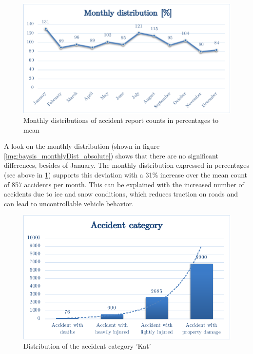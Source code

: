 \documentclass[a4paper,12pt]{report}
\begin{document}
\begin{figure}[h]
	\centering
	\includegraphics[scale=0.6]{./assets/baysis_dataset_monthly_percentage.pdf}
	\caption{Monthly distributions of accident report counts in percentages to mean}
	\label{img:baysis_monthlyDist_percentage}
\end{figure}

A look on the monthly distribution (shown in figure \ref{img:baysis_monthlyDist_absolute}) shows that there are no significant differences, besides of January. The monthly distribution expressed in percentages (see above in \ref{img:baysis_monthlyDist_percentage}) supports this deviation with a 31\% increase over the mean count of 857 accidents per month. This can be explained with the increased number of accidents due to ice and snow conditions, which reduces traction on roads and can lead to uncontrollable vehicle behavior. 

\begin{figure}[h]
	\centering
	\includegraphics[scale=0.6]{./assets/baysis_dataset_Kat.pdf}
	\caption{Distribution of the accident category 'Kat'}
	\label{img:baysis_dataset_Kat}
\end{figure}
\end{document}
